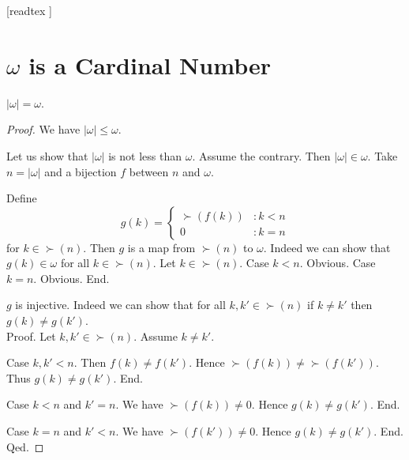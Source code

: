 \documentclass[10pt]{article}
\begin{document}
  \begin{imports}
    \begin{forthel}
      [readtex ]
    \end{forthel}
  \end{imports}


  \section*{$\omega$ is a Cardinal Number}

  \begin{forthel}
    \begin{proposition}
      $|\omega| = \omega$.
    \end{proposition}
    \begin{proof}
      We have $|\omega| \leq \omega$.

      Let us show that $|\omega|$ is not less than $\omega$.
        Assume the contrary.
        Then $|\omega| \in \omega$.
        Take $n = |\omega|$ and a bijection $f$ between $n$ and $\omega$.

        Define \[ g(k) =
          \begin{cases}
            \succ(f(k)) & : k < n
            \\
            0           & : k = n
          \end{cases} \]
        for $k \in \succ(n)$.
        Then $g$ is a map from $\succ(n)$ to $\omega$.
        Indeed we can show that $g(k) \in \omega$ for all $k \in \succ(n)$.
          Let $k \in \succ(n)$.
          Case $k < n$. Obvious.
          Case $k = n$. Obvious.
        End.

        $g$ is injective.
        Indeed we can show that for all $k, k' \in \succ(n)$ if $k \neq k'$
        then $g(k) \neq g(k')$. \\
        Proof.
          Let $k, k' \in \succ(n)$.
          Assume $k \neq k'$.

          Case $k, k' < n$.
            Then $f(k) \neq f(k')$.
            Hence $\succ(f(k)) \neq \succ(f(k'))$.
            Thus $g(k) \neq g(k')$.
          End.

          Case $k < n$ and $k' = n$.
            We have $\succ(f(k)) \neq 0$.
            Hence $g(k) \neq g(k')$.
          End.

          Case $k = n$ and $k' < n$.
            We have $\succ(f(k')) \neq 0$.
            Hence $g(k) \neq g(k')$.
          End.
        Qed.


\end{proof}
\end{forthel}
\end{document}
